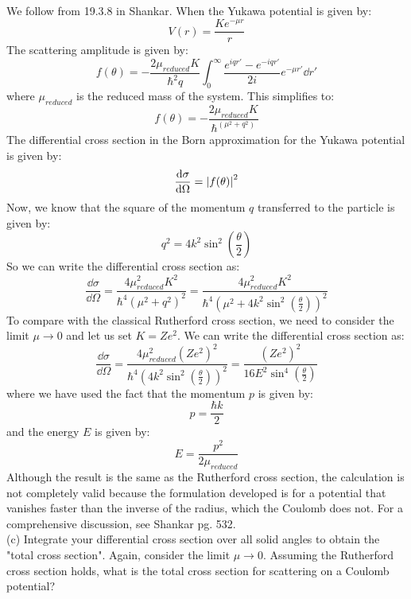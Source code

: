 \documentclass[12pt]{article}
\begin{document}
\subsection{}
We follow from 19.3.8 in Shankar. When the Yukawa potential is given by:
\begin{equation}
  V(r) = \frac{K e^{-\mu r}}{r}
\end{equation}
The scattering amplitude is given by:
\begin{equation}
  f(\theta) = -\frac{2\mu _{reduced}K}{\hbar^2q}\int_{0}^{\infty}\frac{e^{iqr'}-e^{-iqr'}}{2i}e^{-\mu r'}\dd{r'}
\end{equation}
where $\mu _{reduced}$ is the reduced mass of the system.
This simplifies to:
\begin{equation}
  f(\theta) = -\frac{2\mu _{reduced}K}{\hbar^(\mu^2 + q^2)}
\end{equation}
The differential cross section in the Born approximation for the Yukawa potential is given by:
\begin{equation}
  \frac{\dd{\sigma }}{\dd{\Omega }} = \abs{f(\theta)}^2
\end{equation}
Now, we know that the square of the momentum $q$ transferred to the particle is given by:
\begin{equation}
  q^2 = 4k^2\sin^2\left(\frac{\theta}{2}\right)
\end{equation}
So we can write the differential cross section as:
\begin{equation}
  \frac{\dd{\sigma }}{\dd{\Omega }} = \frac{4\mu^2_{reduced}K^2}{\hbar^4(\mu^2 + q^2)^2} = \frac{4\mu^2_{reduced}K^2}{\hbar^4(\mu^2 + 4k^2\sin^2\left(\frac{\theta}{2}\right))^2}
\end{equation}
To compare with the classical Rutherford cross section, we need to consider the limit $\mu \rightarrow 0$ and let us set $K=Ze^2$. We can write the differential cross section as:
\begin{equation}
  \frac{\dd{\sigma }}{\dd{\Omega }} = \frac{4\mu^2_{reduced}(Ze^2)^2}{\hbar^4(4k^2\sin^2\left(\frac{\theta}{2}\right))^2} = \frac{(Ze^2)^2}{16E^2\sin^4\left(\frac{\theta}{2}\right)}
\end{equation}
where we have used the fact that the momentum $p$ is given by:
\begin{equation}
  p = \frac{\hbar k}{2}
\end{equation}
and the energy $E$ is given by:
\begin{equation}
  E = \frac{p^2}{2\mu_{reduced}}
\end{equation}
Although the result is the same as the Rutherford cross section, the calculation is not completely valid because the formulation developed is for a potential that vanishes faster than the inverse of the radius, which the Coulomb does not. For a comprehensive discussion, see Shankar pg. 532.\\
(c) Integrate your differential cross section over all solid angles to obtain the "total cross section". Again, consider the limit $\mu \rightarrow 0$. Assuming the Rutherford cross section holds, what is the total cross section for scattering on a Coulomb potential?
\end{document}
